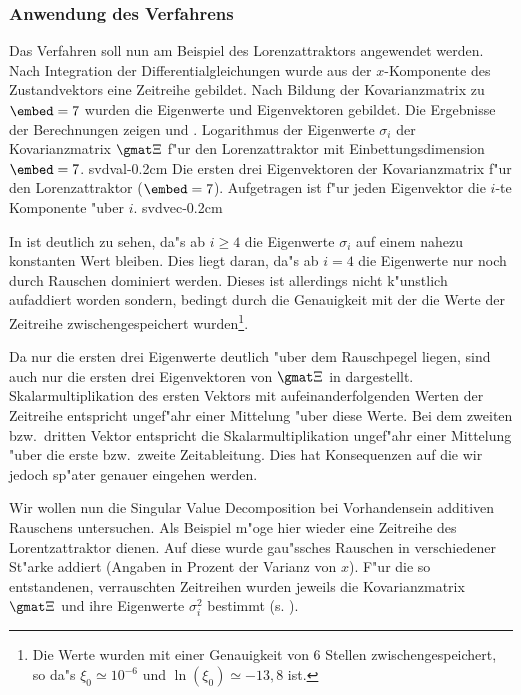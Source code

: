 \subsubsection{Anwendung des Verfahrens}
Das Verfahren soll nun am Beispiel des Lorenzattraktors angewendet werden.
Nach Integration
der Differentialgleichungen wurde aus der $x$-Komponente des Zustandvektors eine Zeitreihe
gebildet.
Nach Bildung der Kovarianzmatrix zu $\embed=7$ wurden die Eigenwerte und Eigenvektoren
gebildet.
Die Ergebnisse der Berechnungen  zeigen  und . 
{Logarithmus der Eigenwerte $\sigma_i$ der Kovarianzmatrix $\gmat \Xi$ f"ur den
Lorenzattraktor mit Einbettungsdimension $\embed=7$.
}
{svdval}{-0.2cm}
{Die ersten drei Eigenvektoren der Kovarianzmatrix f"ur den Lorenzattraktor
($\embed=7$). Aufgetragen ist f"ur jeden Eigenvektor die $i$-te Komponente "uber $i$.}
{svdvec}{-0.2cm}

In  ist deutlich zu sehen, da"s ab $i\geq 4$ die Eigenwerte $\sigma_i$ auf
einem nahezu konstanten Wert bleiben. Dies liegt daran, da"s ab $i=4$ die Eigenwerte nur
noch durch Rauschen dominiert werden. Dieses ist allerdings nicht k"unstlich aufaddiert
worden sondern, bedingt durch die Genauigkeit mit der die Werte der Zeitreihe
zwischengespeichert wurden\footnote{Die Werte wurden mit einer Genauigkeit von 6 Stellen
zwischengespeichert, so da"s $\xi_0\simeq 10^{-6}$ und $\ln(\xi_0)\simeq -13,8$ ist.}. 

Da nur die ersten drei Eigenwerte deutlich "uber dem Rauschpegel liegen, sind auch nur die
ersten drei Eigenvektoren von $\gmat\Xi$ in 
dargestellt. Skalarmultiplikation des ersten Vektors mit aufeinanderfolgenden Werten der
Zeitreihe entspricht ungef"ahr einer Mittelung "uber diese Werte. Bei dem zweiten bzw.\
dritten Vektor entspricht die Skalarmultiplikation ungef"ahr einer Mittelung "uber die
erste bzw.\  zweite Zeitableitung. Dies hat Konsequenzen auf die wir jedoch sp"ater
genauer eingehen werden.

Wir wollen nun die Singular Value Decomposition bei Vorhandensein additiven Rauschens
untersuchen. 
Als Beispiel m"oge hier wieder eine Zeitreihe des Lorentzattraktor dienen. 
Auf diese wurde gau"ssches Rauschen in verschiedener St"arke addiert (Angaben in 
Prozent der Varianz von $x$). 
F"ur die so entstandenen, verrauschten Zeitreihen wurden jeweils die
Kovarianzmatrix $\gmat \Xi$ und ihre Eigenwerte $\sigma_i^2$ bestimmt (s. ).

